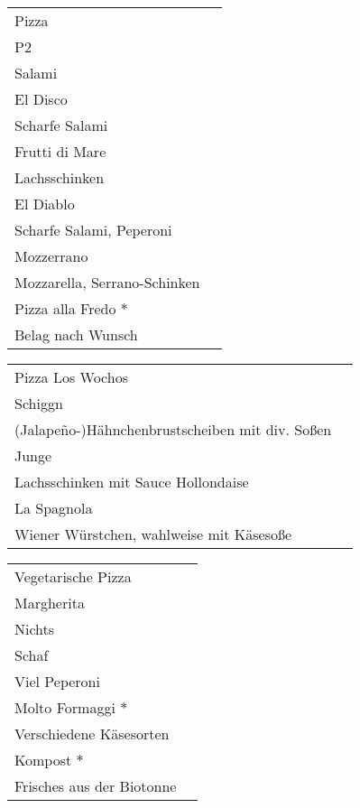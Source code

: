 \documentclass[12pt]{article}
\makeatletter
\newcommand*\ColText[1]{\textcolor{Goldenrod3}{#1}}
\newenvironment{Group}[1]
  {\noindent\begin{tabular*}{\textwidth}{@{}p{\linewidth}@{\extracolsep{\fill}}r@{}}
    {\fontsize{24}{29}\selectfont\ColText{#1}}\\[0.8em]}
  {\end{tabular*}}
\newcommand*\Entry[2]{%
  \sffamily#1 & #2}
\newcommand*\Expl[1]{%
  \hspace*{1em}\footnotesize #1}
\makeatother
\begin{document}
\vspace{1em}

\begin{Group}{Pizza}
\Entry{P2}{} \\
\Expl{Salami} \\
\Entry{El Disco}{} \\
\Expl{Scharfe Salami} \\
\Entry{Frutti di Mare}{} \\
\Expl{Lachsschinken} \\
\Entry{El Diablo}{} \\
\Expl{Scharfe Salami, Peperoni} \\
\Entry{Mozzerrano}{} \\
\Expl{Mozzarella, Serrano-Schinken} \\
\Entry{Pizza alla Fredo $\ast$}{} \\
\Expl{Belag nach Wunsch} \\
\end{Group}

\vspace{1em}

\begin{Group}{Pizza Los Wochos}
\Entry{Schiggn}{} \\
\Expl{(Jalape\~{n}o-)Hähnchenbrustscheiben mit div. Soßen} \\
\Entry{Junge}{} \\
\Expl{Lachsschinken mit Sauce Hollondaise} \\
\Entry{La Spagnola}{} \\
\Expl{Wiener Würstchen, wahlweise mit Käsesoße}
\end{Group}

\vspace{1em}

\begin{Group}{Vegetarische Pizza}
\Entry{Margherita}{} \\ 
\Expl{Nichts} \\
\Entry{Schaf}{} \\ 
\Expl{Viel Peperoni} \\
\Entry{Molto Formaggi $\ast$}{} \\ 
\Expl{Verschiedene Käsesorten} \\
\Entry{Kompost $\ast$}{} \\ 
\Expl{Frisches aus der Biotonne} \\
\end{Group}
\end{document}
